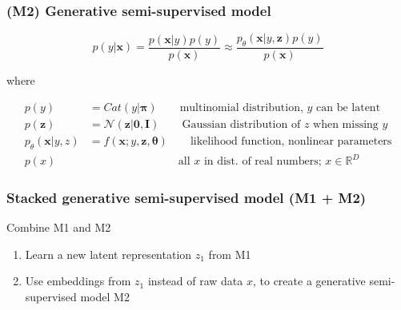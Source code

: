 \documentclass{beamer}
\begin{document}
\begin{frame}
  \frametitle{(M2) Generative semi-supervised model}

  \[
  p(y|\mathbf{x}) = \frac{p(\mathbf{x}|y) p(y)}{p(\mathbf{x})} \approx
  \frac{p_\theta (\mathbf{x}|y, \mathbf{z}) p(y)}{p(\mathbf{x})}
  \]

  where

  \begin{align*}
    p(y) &= Cat(y|\mathbf{\pi}) \qquad \text{multinomial distribution, $y$ can be latent} \\
    p(\mathbf{z}) &= \mathcal{N}(\mathbf{z|0,I}) \qquad
    \text{Gaussian distribution of $z$ when missing $y$} \\
    p_\theta (\mathbf{x}|y,z) &= f(\mathbf{x};y,\mathbf{z},\mathbf{\theta})
    \qquad \text{likelihood function, nonlinear parameters} \\
    p(x) & \qquad \qquad \qquad \qquad \text{all $x$ in dist. of real numbers;  $x \in \mathbb{R}^{D}$}
    \end{align*}
  
\end{frame}

\begin{frame}
  \frametitle{Stacked generative semi-supervised model (M1 + M2)}

  Combine M1 and M2
  \begin{enumerate}
  \item Learn a new latent representation $z_1$ from M1
  \item Use embeddings from $z_1$ instead of raw data $x$, to create
    a generative semi-supervised model M2
  \end{enumerate}

  \begin{center}
  \end{center}

  

\end{frame}
\end{document}
